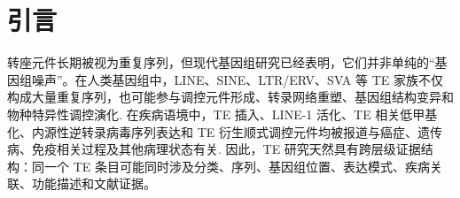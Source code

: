 \documentclass[12pt,a4paper,UTF8]{ctexart}
\begin{document}
\cover
\clearpage

\thispagestyle{empty}
\begin{abstract}
转座元件（transposable elements, TEs）是人类基因组的重要组成部分，能够通过插入突变、基因组重排、调控元件供给、表观遗传失衡和转录调控等方式影响基因组功能与疾病相关过程\cite{lander2001human,cordaux2009retrotransposons,chuong2017regulatory,bourque2018ten,burns2017cancer,payer2019genetic}。然而，TE 相关证据通常分散在分类数据库、重复序列注释、基因组位置、表达数据、疾病关联、文献记录和人工整理的知识条目中。研究者若希望回答某一 TE 是否与特定疾病、功能或分子机制相关，往往需要在多个孤立资源之间切换，并且难以追踪每一条关系背后的 PMID 级文献证据。因此，该项目拟构建一个面向转座元件疾病机制研究的证据链接知识图谱资源，将 TE 分类体系、基因组与表达上下文、疾病/功能关系和 PubMed 文献证据组织到同一可浏览、可审查、可导出的 TE-KG 工作流中。

该项目的核心假设是：如果将 TE 相关实体、关系和文献证据组织为以 Neo4j 为核心的知识图谱，并通过接口契约检查、浏览器回归检查、PMID 级证据表和 FAIR 数据开放计划进行约束，则该资源能够比孤立表格或人工检索更透明地支持 TE 疾病机制假设的提出与证据审查。这里的 FAIR 指数据和元数据应尽可能可发现、可访问、可互操作和可复用。当前 TE-KG 已有本地初步平台，包括图谱运行时、PHP 接口、浏览器图谱界面、表达数据入口、PubMed 元数据增强流程和代表性 TE 查询案例。本文在现有平台基础上提出进一步完善数据获取、图谱构建、证据链接、用户工作流、自然语言问答助手和评估体系的研究方案。预期成果是一个可复现、可审计、可扩展的 TE-KG 资源，使研究者能够从 TE 实体出发追踪疾病/功能关系、检查文献证据、导出局部子图，并清晰区分“关系有证据记录”“期刊元数据覆盖”和“仍需人工验证的机制解释”。
\end{abstract}

\clearpage
\tableofcontents

\clearpage
{}

\section{引言}

转座元件长期被视为重复序列，但现代基因组研究已经表明，它们并非单纯的“基因组噪声”。在人类基因组中，LINE、SINE、LTR/ERV、SVA 等 TE 家族不仅构成大量重复序列，也可能参与调控元件形成、转录网络重塑、基因组结构变异和物种特异性调控演化\cite{lander2001human,cordaux2009retrotransposons,chuong2017regulatory,bourque2018ten}. 在疾病语境中，TE 插入、LINE-1 活化、TE 相关低甲基化、内源性逆转录病毒序列表达和 TE 衍生顺式调控元件均被报道与癌症、遗传病、免疫相关过程及其他病理状态有关\cite{burns2017cancer,payer2019genetic,chen2022transposable}. 因此，TE 研究天然具有跨层级证据结构：同一个 TE 条目可能同时涉及分类、序列、基因组位置、表达模式、疾病关联、功能描述和文献证据。
\end{document}
